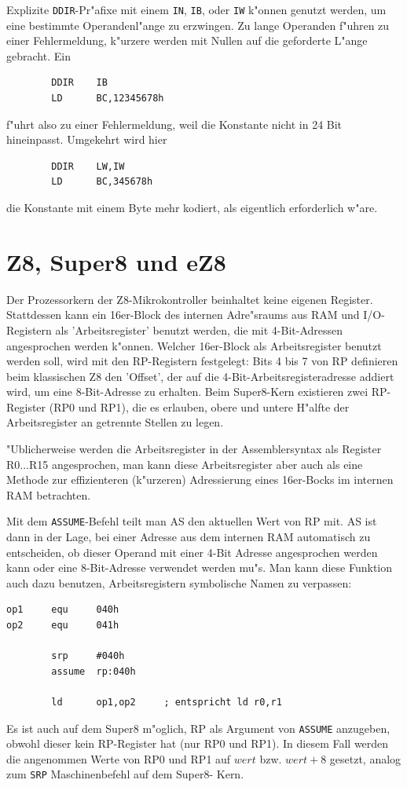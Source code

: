 \documentclass[12pt,a4paper,twoside]{report}
\newcommand{\tty}[1]{{\tt #1}}
\newcommand{\asname}{AS}
\begin{document}
Explizite \tty{DDIR}-Pr"afixe mit einem \tty{IN}, \tty{IB}, oder
\tty{IW} k"onnen genutzt werden, um eine bestimmte Operandenl"ange
zu erzwingen.  Zu lange Operanden f"uhren zu einer Fehlermeldung,
k"urzere werden mit Nullen auf die geforderte L"ange gebracht.  Ein
\begin{verbatim}
        DDIR    IB
        LD      BC,12345678h
\end{verbatim}
f"uhrt also zu einer Fehlermeldung, weil die Konstante nicht in 24
Bit hineinpasst.  Umgekehrt wird hier
\begin{verbatim}
        DDIR    LW,IW
        LD      BC,345678h
\end{verbatim}
die Konstante mit einem Byte mehr kodiert, als eigentlich
erforderlich w"are.


\section{Z8, Super8 und eZ8}
\label{Z8Spec}

Der Prozessorkern der Z8-Mikrokontroller beinhaltet keine eigenen
Register.  Stattdessen kann ein 16er-Block des internen Adre"sraums
aus RAM und I/O-Registern als 'Arbeitsregister' benutzt werden, die
mit 4-Bit-Adressen angesprochen werden k"onnen.  Welcher 16er-Block
als Arbeitsregister benutzt werden soll, wird mit den RP-Registern
festgelegt: Bits 4 bis 7 von RP definieren beim klassischen Z8 den
'Offset', der auf die 4-Bit-Arbeitsregisteradresse addiert wird,
um eine 8-Bit-Adresse zu erhalten.  Beim Super8-Kern existieren
zwei RP-Register (RP0 und RP1), die es erlauben, obere und untere
H"alfte der Arbeitsregister an getrennte Stellen zu legen.

"Ublicherweise werden die Arbeitsregister in der Assemblersyntax als
Register R0...R15 angesprochen, man kann diese Arbeitsregister aber
auch als eine Methode zur effizienteren (k"urzeren) Adressierung eines
16er-Bocks im internen RAM betrachten.

Mit dem \tty{ASSUME}-Befehl teilt man \asname{} den aktuellen Wert von RP mit.  \asname{}
ist dann in der Lage, bei einer Adresse aus dem internen RAM
automatisch zu entscheiden, ob dieser Operand mit einer 4-Bit Adresse
angesprochen werden kann oder eine 8-Bit-Adresse verwendet werden
mu"s.  Man kann diese Funktion auch dazu benutzen, Arbeitsregistern
symbolische Namen zu verpassen:
\begin{verbatim}
op1     equ     040h
op2     equ     041h

        srp     #040h
        assume  rp:040h

        ld      op1,op2		; entspricht ld r0,r1
\end{verbatim}
Es ist auch auf dem Super8 m"oglich, RP als Argument von \tty{ASSUME}
anzugeben, obwohl dieser kein RP-Register hat (nur RP0 und RP1).  In
diesem Fall werden die angenommen Werte von RP0 und RP1 auf $wert$ bzw.
$wert+8$ gesetzt, analog zum \tty{SRP} Maschinenbefehl auf dem Super8-
Kern.
\end{document}
